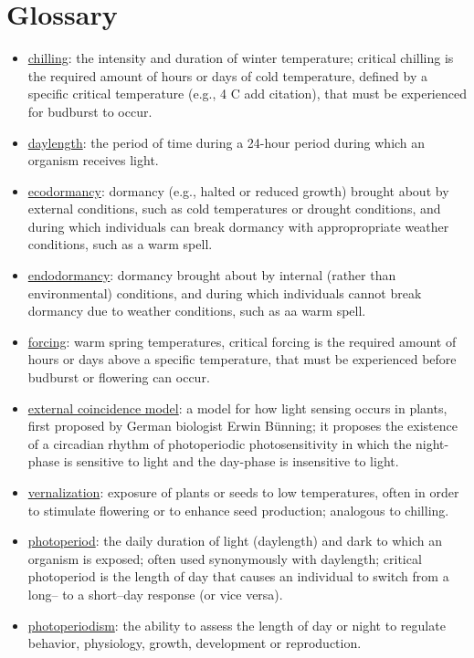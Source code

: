 \documentclass{article}
\begin{document}
\section* {Glossary}
\begin{itemize}
\item \underline{chilling}: the intensity and duration of winter temperature; critical chilling is the required amount of hours or days of cold temperature, defined by a specific critical temperature (e.g., 4 \degree C add citation), that must be experienced for budburst to occur.
\item \underline{daylength}: the period of time during a 24-hour period during which an organism receives light.
\item \underline{ecodormancy}: dormancy (e.g., halted or reduced growth) brought about by external conditions, such as cold temperatures or drought conditions, and during which individuals can break dormancy with appropropriate weather conditions, such as a warm spell. 
\item \underline{endodormancy}: dormancy brought about by internal (rather than environmental) conditions, and during which individuals cannot break dormancy due to weather conditions, such as aa warm spell. 
\item \underline{forcing}: warm spring temperatures, critical forcing is the required amount of hours or days above a specific temperature, that must be experienced before budburst or flowering can occur.
\item \underline{external coincidence model}: a model for how light sensing occurs in plants, first proposed by German biologist Erwin Bünning; it proposes the existence of a circadian rhythm of photoperiodic photosensitivity in which the night-phase is sensitive to light and the day-phase is insensitive to light. 
\item \underline{vernalization}: exposure of plants or seeds to low temperatures, often in order to stimulate flowering or to enhance seed production; analogous to chilling.
\item \underline{photoperiod}: the daily duration of light (daylength) and dark to which an organism is exposed; often used synonymously with daylength; critical photoperiod is the length of day that causes an individual to switch from a long-- to a short--day response (or vice versa).
\item \underline{photoperiodism}: the ability to assess the length of day or night to regulate behavior, physiology, growth, development or reproduction.
\end{itemize}
\end{document}
